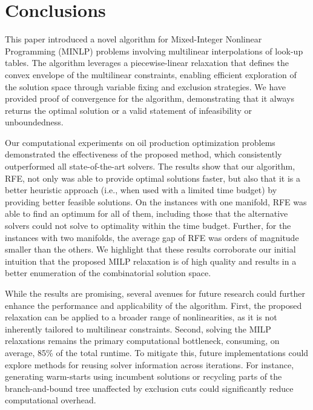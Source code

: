 \documentclass[pdflatex,sn-mathphys-num]{sn-jnl}%
\newcommand{\new}[1]{#1}
\begin{document}

\section{Conclusions} \label{sec:conclusion}

This paper introduced a novel algorithm for Mixed-Integer Nonlinear Programming (MINLP) problems involving multilinear interpolations of look-up tables.
The algorithm leverages a piecewise-linear relaxation that defines the convex envelope of the multilinear constraints, enabling efficient exploration of the solution space through variable fixing and exclusion strategies.
We have provided proof of convergence for the algorithm, demonstrating that it always returns the optimal solution or a valid statement of infeasibility or unboundedness.

Our computational experiments on oil production optimization problems demonstrated the effectiveness of the proposed method, which consistently outperformed all state-of-the-art solvers.
The results show that our algorithm, RFE, not only was able to provide optimal solutions faster, but also that it is a better heuristic approach (i.e., when used with a limited time budget) by providing better feasible solutions.
\new{On the instances with one manifold, RFE was able to find an optimum for all of them, including those that the alternative solvers could not solve to optimality within the time budget.  
Further, for the instances with two manifolds, the average gap of RFE was orders of magnitude smaller than the others.}
We highlight that these results corroborate our initial intuition that the proposed \new{MILP relaxation is of high quality and} results in a better enumeration of the combinatorial solution space.

While the results are promising, several avenues for future research could further enhance the performance and applicability of the algorithm.
First, the proposed relaxation can be applied to a broader range of nonlinearities, as it is not inherently tailored to multilinear constraints.
\new{Second, solving the MILP relaxations remains the primary computational bottleneck, consuming, on average, 85\% of the total runtime.}
To mitigate this, future implementations could explore methods for reusing solver information across iterations.
For instance, generating warm-starts using incumbent solutions or recycling parts of the branch-and-bound tree unaffected by exclusion cuts could significantly reduce computational overhead.
\end{document}
